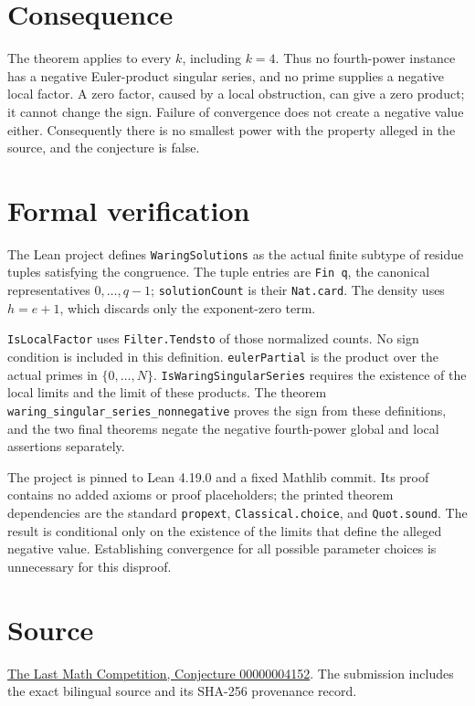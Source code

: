 \documentclass[11pt]{article}
\begin{document}
\section*{Consequence}
The theorem applies to every $k$, including $k=4$. Thus no fourth-power instance has a negative Euler-product singular series, and no prime supplies a negative local factor. A zero factor, caused by a local obstruction, can give a zero product; it cannot change the sign. Failure of convergence does not create a negative value either. Consequently there is no smallest power with the property alleged in the source, and the conjecture is false.

\section*{Formal verification}
The Lean project defines \texttt{WaringSolutions} as the actual finite subtype of residue tuples satisfying the congruence. The tuple entries are \texttt{Fin q}, the canonical representatives $0,\ldots,q-1$; \texttt{solutionCount} is their \texttt{Nat.card}. The density uses $h=e+1$, which discards only the exponent-zero term.

\texttt{IsLocalFactor} uses \texttt{Filter.Tendsto} of those normalized counts. No sign condition is included in this definition. \texttt{eulerPartial} is the product over the actual primes in $\{0,\ldots,N\}$. \texttt{IsWaringSingularSeries} requires the existence of the local limits and the limit of these products. The theorem \texttt{waring\_singular\_series\_nonnegative} proves the sign from these definitions, and the two final theorems negate the negative fourth-power global and local assertions separately.

The project is pinned to Lean 4.19.0 and a fixed Mathlib commit. Its proof contains no added axioms or proof placeholders; the printed theorem dependencies are the standard \texttt{propext}, \texttt{Classical.choice}, and \texttt{Quot.sound}. The result is conditional only on the existence of the limits that define the alleged negative value. Establishing convergence for all possible parameter choices is unnecessary for this disproof.

\section*{Source}
\href{https://github.com/The-Last-Math-Competition/The-Last-Math-Competition/blob/main/conjectures/00000004152.md}{The Last Math Competition, Conjecture 00000004152}. The submission includes the exact bilingual source and its SHA-256 provenance record.
\end{document}
